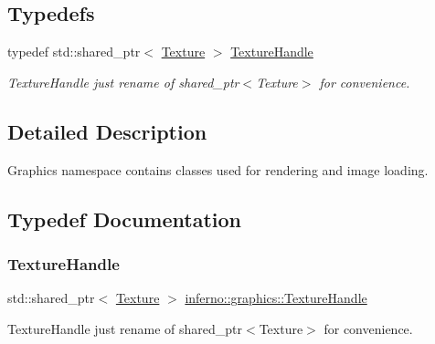 \subsection*{Typedefs}
\begin{DoxyCompactItemize}
\item 
typedef std\+::shared\+\_\+ptr$<$ \mbox{\hyperlink{classinferno_1_1graphics_1_1_texture}{Texture}} $>$ \mbox{\hyperlink{namespaceinferno_1_1graphics_a9d719bfbfedd17b9ace9b8d603ab5a38}{Texture\+Handle}}
\begin{DoxyCompactList}\small\item\em Texture\+Handle just rename of shared\+\_\+ptr$<$\+Texture$>$ for convenience. \end{DoxyCompactList}\end{DoxyCompactItemize}


\subsection{Detailed Description}
Graphics namespace contains classes used for rendering and image loading. 

\subsection{Typedef Documentation}
\mbox{\label{namespaceinferno_1_1graphics_a9d719bfbfedd17b9ace9b8d603ab5a38}} 
\subsubsection{\texorpdfstring{Texture\+Handle}{TextureHandle}}
{\footnotesize\ttfamily std\+::shared\+\_\+ptr$<$ \mbox{\hyperlink{classinferno_1_1graphics_1_1_texture}{Texture}} $>$ \mbox{\hyperlink{namespaceinferno_1_1graphics_a9d719bfbfedd17b9ace9b8d603ab5a38}{inferno\+::graphics\+::\+Texture\+Handle}}}



Texture\+Handle just rename of shared\+\_\+ptr$<$\+Texture$>$ for convenience. 

